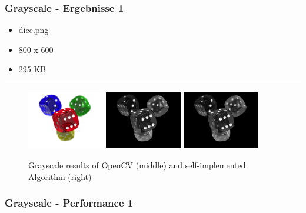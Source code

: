 \begin{frame}
    \frametitle{Grayscale - Ergebnisse 1}

    \begin{itemize}
        \item dice.png
        \item 800 x 600
        \item 295 KB
    \end{itemize}

    \hfill
    \hrule
    \hfill

    \begin{figure}[H]
        \centering
    
        \includegraphics[width=0.30\textwidth]{images/dice.png}
        \includegraphics[width=0.30\textwidth]{images/results/grayscale-cv.dice.png}
        \includegraphics[width=0.30\textwidth]{images/results/grayscale-my.dice.png}

        
        \begin{center}
            \caption{Grayscale results of OpenCV (middle) and self-implemented  Algorithm (right)}            
        \end{center}

        \label{fig:grayscale1}
    \end{figure}
\end{frame}

\begin{frame}
    \frametitle{Grayscale - Performance 1}

    

\end{frame}

